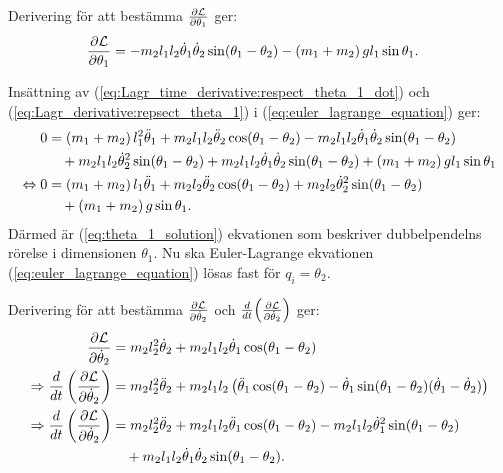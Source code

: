 Derivering för att bestämma $\frac{\partial \mathcal{L}}{\partial \theta_1}$ ger:
\begin{align}
    \frac{\partial \mathcal{L}}{\partial \theta_1} &= -m_2l_1l_2\dot{\theta}_1\dot{\theta}_2\sin(\theta_1-\theta_2) - \left(m_1 + m_2\right)gl_1\sin{\theta_1}. \label{eq:Lagr_derivative:repsect_theta_1}
\end{align}

Insättning av (\ref{eq:Lagr_time_derivative:respect_theta_1_dot}) och (\ref{eq:Lagr_derivative:repsect_theta_1}) i (\ref{eq:euler_lagrange_equation}) ger:
\begin{align}
    0 &=\left(m_1+m_2\right)l_1^2\ddot{\theta}_1 + m_2l_1l_2\ddot{\theta}_2\cos(\theta_1-\theta_2)
    - m_2l_1l_2\dot{\theta}_1\dot{\theta}_2\sin(\theta_1-\theta_2) \notag \\
    &\quad + m_2l_1l_2\dot{\theta}_2^2\sin(\theta_1-\theta_2) + m_2l_1l_2\dot{\theta}_1\dot{\theta}_2\sin(\theta_1-\theta_2) + \left(m_1 + m_2\right)gl_1\sin{\theta_1} \notag\\
    \Leftrightarrow 0 &= \left(m_1+m_2\right)l_1\ddot{\theta}_1 + m_2l_2\ddot{\theta}_2\cos(\theta_1-\theta_2)
    + m_2l_2\dot{\theta}_2^2\sin(\theta_1-\theta_2) \notag \\
    &\quad + \left(m_1 + m_2\right)g\sin{\theta_1}. \label{eq:theta_1_solution}
\end{align}
Därmed är (\ref{eq:theta_1_solution}) ekvationen som beskriver dubbelpendelns rörelse i dimensionen $\theta_1$. Nu ska Euler-Lagrange ekvationen (\ref{eq:euler_lagrange_equation}) lösas fast för $q_i = \theta_2$.

Derivering för att bestämma $ \frac{\partial \mathcal{L}}{\partial \dot{\theta}_2}$ och $\frac{d}{dt}\!\left(\frac{\partial \mathcal{L}}{\partial \dot{\theta}_2}\right)$ ger:
\begin{align}
    \frac{\partial \mathcal{L}}{\partial \dot{\theta}_2} &= m_2l_2^2\dot{\theta}_2 + m_2l_1l_2\dot{\theta}_1\cos(\theta_1 - \theta_2) \notag\\
    \Rightarrow \frac{d}{dt}\left(\frac{\partial \mathcal{L}}{\partial \dot{\theta}_2}\right) &= m_2l_2^2\ddot{\theta}_2 + m_2l_1l_2\left(\ddot{\theta}_1\cos(\theta_1-\theta_2) - \dot{\theta}_1\sin(\theta_1 - \theta_2)(\dot{\theta}_1 - \dot{\theta}_2)\right) \notag \\
    \Rightarrow \frac{d}{dt}\left(\frac{\partial \mathcal{L}}{\partial \dot{\theta}_2}\right) &= m_2l_2^2\ddot{\theta}_2 + m_2l_1l_2\ddot{\theta}_1\cos(\theta_1-\theta_2) - m_2l_1l_2\dot{\theta}_1^2\sin(\theta_1-\theta_2) \notag \\
    &\quad + m_2l_1l_2\dot{\theta}_1\dot{\theta}_2\sin(\theta_1 - \theta_2). \label{eq:Lagr_time_derivative:respect_theta_2_dot}
\end{align}

